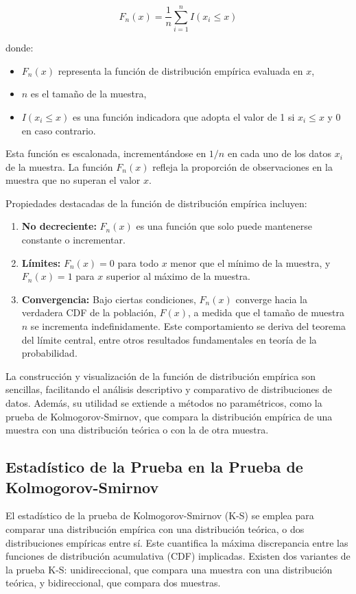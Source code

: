 \documentclass{article}
\begin{document}
\begin{equation}
    F_n(x) = \frac{1}{n} \sum_{i=1}^n I(x_i \leq x)
\end{equation}

donde:
\begin{itemize}
    \item \(F_n(x)\) representa la función de distribución empírica evaluada en \(x\),
    \item \(n\) es el tamaño de la muestra,
    \item \(I(x_i \leq x)\) es una función indicadora que adopta el valor de 1 si \(x_i \leq x\) y 0 en caso contrario.
\end{itemize}

Esta función es escalonada, incrementándose en \(1/n\) en cada uno de los datos \(x_i\) de la muestra. La función \(F_n(x)\) refleja la proporción de observaciones en la muestra que no superan el valor \(x\).

Propiedades destacadas de la función de distribución empírica incluyen:
\begin{enumerate}
    \item \textbf{No decreciente:} \(F_n(x)\) es una función que solo puede mantenerse constante o incrementar.
    \item \textbf{Límites:} \(F_n(x) = 0\) para todo \(x\) menor que el mínimo de la muestra, y \(F_n(x) = 1\) para \(x\) superior al máximo de la muestra.
    \item \textbf{Convergencia:} Bajo ciertas condiciones, \(F_n(x)\) converge hacia la verdadera CDF de la población, \(F(x)\), a medida que el tamaño de muestra \(n\) se incrementa indefinidamente. Este comportamiento se deriva del teorema del límite central, entre otros resultados fundamentales en teoría de la probabilidad.
\end{enumerate}

La construcción y visualización de la función de distribución empírica son sencillas, facilitando el análisis descriptivo y comparativo de distribuciones de datos. Además, su utilidad se extiende a métodos no paramétricos, como la prueba de Kolmogorov-Smirnov, que compara la distribución empírica de una muestra con una distribución teórica o con la de otra muestra.
\subsection{Estadístico de la Prueba en la Prueba de Kolmogorov-Smirnov}

El estadístico de la prueba de Kolmogorov-Smirnov (K-S) se emplea para comparar una distribución empírica con una distribución teórica, o dos distribuciones empíricas entre sí. Este cuantifica la máxima discrepancia entre las funciones de distribución acumulativa (CDF) implicadas. Existen dos variantes de la prueba K-S: unidireccional, que compara una muestra con una distribución teórica, y bidireccional, que compara dos muestras.
\end{document}
